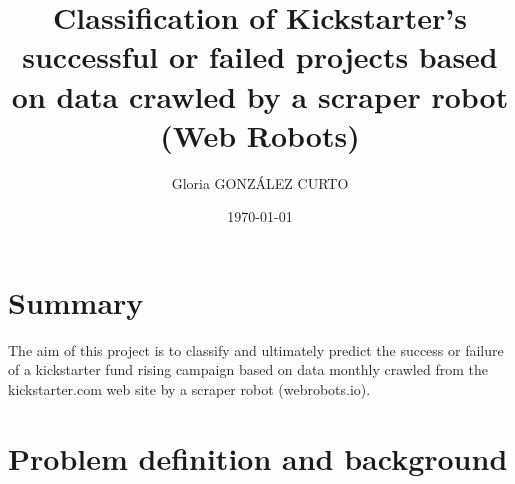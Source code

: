 \documentclass{article}
\title{Classification of Kickstarter's successful or failed projects based on data crawled by a scraper robot (Web Robots)}
\author{Gloria GONZÁLEZ CURTO}
\date{\today}
\begin{document}
\maketitle

\tableofcontents


\section{Summary}
\label{ref:sum}
The aim of this project is to classify and ultimately predict the success or failure of a kickstarter fund rising campaign based on data monthly crawled from the kickstarter.com web site by a scraper robot (webrobots.io).

\section{Problem definition and background}
\end{document}
